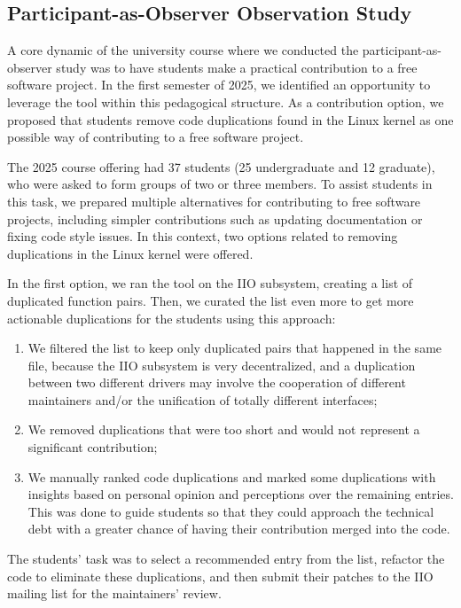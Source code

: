 \documentclass[10pt,conference]{IEEEtran}
\begin{document}
\subsection{Participant-as-Observer Observation Study}

A core dynamic of the university course where we conducted the participant-as-observer study was to have students make a practical contribution to a free software project. In the first semester of 2025, we identified an opportunity to leverage the tool within this pedagogical structure. As a contribution option, we proposed that students remove code duplications found in the Linux kernel as one possible way of contributing to a free software project.

The 2025 course offering had 37 students (25 undergraduate and 12 graduate), who were asked to form groups of two or three members. To assist students in this task, we prepared multiple alternatives for contributing to free software projects, including simpler contributions such as updating documentation or fixing code style issues. In this context, two options related to removing duplications in the Linux kernel were offered.

In the first option, we ran the tool on the IIO subsystem, creating a list of duplicated function pairs. Then, we curated the list even more to get more actionable duplications for the students using this approach:

\begin{enumerate}
    \item We filtered the list to keep only duplicated pairs that happened in the same file, because the IIO subsystem is very decentralized, and a duplication between two different drivers may involve the cooperation of different maintainers and/or the unification of totally different interfaces;
    \item We removed duplications that were too short and would not represent a significant contribution;
    \item We manually ranked code duplications and marked some duplications with insights based on personal opinion and perceptions over the remaining entries. This was done to guide students so that they could approach the technical debt with a greater chance of having their contribution merged into the code.
\end{enumerate}

The students' task was to select a recommended entry from the list, refactor the code to eliminate these duplications, and then submit their patches to the IIO mailing list for the maintainers' review.
\end{document}
